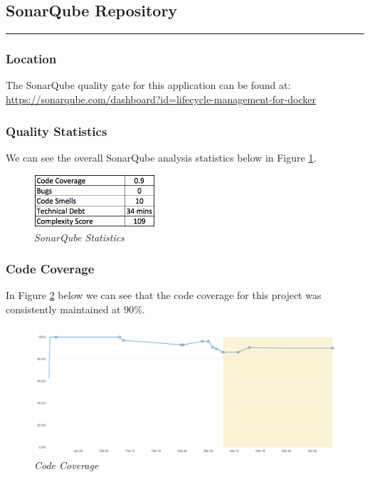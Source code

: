 \subsection{SonarQube Repository} 
\label{appendix:sonarqube}
\rule{\textwidth}{0.4pt}
\subsubsection{Location}
The SonarQube quality gate for this application can be found at:
\url{https://sonarqube.com/dashboard?id=lifecycle-management-for-docker}

\subsubsection{Quality Statistics}

We can see the overall SonarQube analysis statistics below in Figure \ref{fig:sonar-summary}.
\begin{figure}[!ht]
\centering
\includegraphics*[width=0.4\textwidth]{images/sonar-summary}
\caption{\em SonarQube Statistics}
\label{fig:sonar-summary}
\end{figure}

\subsubsection{Code Coverage}
In Figure \ref{fig:code_coverage} below we can see that the code coverage for this project was consistently maintained at 90\%.

\begin{figure}[!ht]
\centering
\includegraphics*[width=\textwidth]{images/code_coverage}
\caption{\em Code Coverage}
\label{fig:code_coverage} 
\end{figure}

